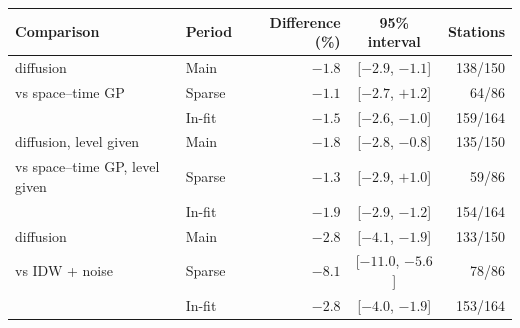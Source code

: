 \begin{tabular}{llrcr}
\toprule
Comparison & Period & Difference (\%) & 95\% interval & Stations \\
\midrule
diffusion & Main & $-1.8$ & [$-2.9$, $-1.1$] & 138/150 \\
vs space--time GP & Sparse & $-1.1$ & [$-2.7$, $+1.2$] & 64/86 \\
 & In-fit & $-1.5$ & [$-2.6$, $-1.0$] & 159/164 \\
\addlinespace
diffusion, level given & Main & $-1.8$ & [$-2.8$, $-0.8$] & 135/150 \\
vs space--time GP, level given & Sparse & $-1.3$ & [$-2.9$, $+1.0$] & 59/86 \\
 & In-fit & $-1.9$ & [$-2.9$, $-1.2$] & 154/164 \\
\addlinespace
diffusion & Main & $-2.8$ & [$-4.1$, $-1.9$] & 133/150 \\
vs IDW + noise & Sparse & $-8.1$ & [$-11.0$, $-5.6$] & 78/86 \\
 & In-fit & $-2.8$ & [$-4.0$, $-1.9$] & 153/164 \\
\bottomrule
\end{tabular}
